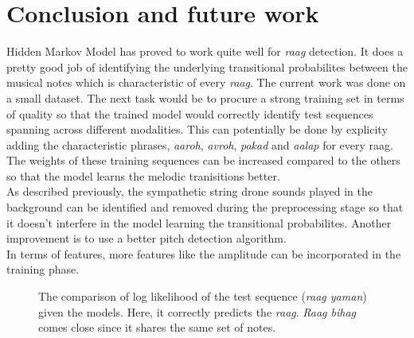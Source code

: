 \documentclass[letterpaper, 10 pt, conference]{ieeeconf}  %
\begin{document}
\section{Conclusion and future work}
Hidden Markov Model has proved to work quite well for \textit{raag} detection. It does a pretty good job of identifying the underlying transitional probabilites between the musical notes which is characteristic of every \textit{raag}. The current work was done on a small dataset. The next task would be to procure a strong training set in terms of quality so that the trained model would correctly identify test sequences spanning across different modalities. This can potentially be done by explicity adding the characteristic phrases, \textit{aaroh}, \textit{avroh}, \textit{pakad} and \textit{aalap} for every raag. The weights of these training sequences can be increased compared to the others so that the model learns the melodic tranisitions better. \\
As described previously, the sympathetic string drone sounds played in the background can be identified and removed during the preprocessing stage so that it doesn't interfere in the model learning the transitional probabilites. Another improvement is to use a better pitch detection algorithm. \\
   
   
In terms of features, more features like the amplitude can be incorporated in the training phase.  

   \begin{figure}[thpb]
      \centering
      \caption{The comparison of log likelihood of the test sequence (\textit{raag yaman}) given the models. Here, it correctly predicts the \textit{raag}. \textit{Raag bihag} comes close since it shares the same set of notes.}
      \label{figurelabel}
   \end{figure}
   
\end{document}
